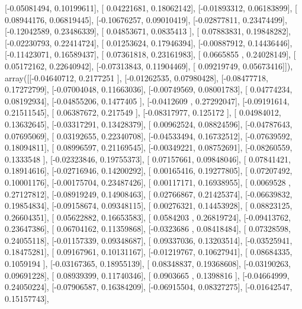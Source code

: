 \documentclass{article}
\begin{document}
       [-0.05081494,  0.10199611],
       [ 0.04221681,  0.18062142],
       [-0.01893312,  0.06183899],
       [ 0.08944176,  0.06819445],
       [-0.10676257,  0.09010419],
       [-0.02877811,  0.23474499],
       [-0.12042589,  0.23486339],
       [ 0.04853671,  0.0835413 ],
       [ 0.07883831,  0.19848282],
       [-0.02230793,  0.22414724],
       [ 0.01253624,  0.17946394],
       [-0.00887912,  0.14436446],
       [-0.11423071,  0.16589437],
       [ 0.07361818,  0.23161983],
       [ 0.0665855 ,  0.24028149],
       [ 0.05172162,  0.22640942],
       [-0.07313843,  0.11904469],
       [ 0.09219749,  0.05673416]]), array([[-0.04640712,  0.2177251 ],
       [-0.01262535,  0.07980428],
       [-0.08477718,  0.17272799],
       [-0.07004048,  0.11663036],
       [-0.00749569,  0.08001783],
       [ 0.04774234,  0.08192934],
       [-0.04855206,  0.1477405 ],
       [-0.0412609 ,  0.27292047],
       [-0.09191614,  0.21511545],
       [ 0.06387672,  0.217549  ],
       [-0.08317977,  0.125172  ],
       [ 0.04984012,  0.13632645],
       [-0.03317291,  0.13428379],
       [ 0.00962524,  0.08824596],
       [-0.04787643,  0.07695069],
       [ 0.03192655,  0.22340708],
       [-0.04533494,  0.16732512],
       [-0.07639592,  0.18094811],
       [ 0.08996597,  0.21169545],
       [-0.00349221,  0.08752691],
       [-0.08260559,  0.1333548 ],
       [-0.02323846,  0.19755373],
       [ 0.07157661,  0.09848046],
       [ 0.07841421,  0.18914616],
       [-0.02716946,  0.14200292],
       [ 0.00165416,  0.19277805],
       [ 0.07207492,  0.10001176],
       [-0.00175704,  0.23487426],
       [ 0.00117171,  0.16938955],
       [ 0.0069528 ,  0.27127812],
       [-0.08919249,  0.14908463],
       [ 0.02766867,  0.21425374],
       [-0.06639832,  0.19854834],
       [-0.09158674,  0.09348115],
       [ 0.00276321,  0.14453928],
       [ 0.08823125,  0.26604351],
       [ 0.05622882,  0.16653583],
       [ 0.0584203 ,  0.26819724],
       [-0.09413762,  0.23647386],
       [ 0.06704162,  0.11359868],
       [-0.0323686 ,  0.08418484],
       [ 0.07328598,  0.24055118],
       [-0.01157339,  0.09348687],
       [ 0.09337036,  0.13203514],
       [-0.03525941,  0.18475281],
       [ 0.09167961,  0.10131167],
       [-0.01219767,  0.10627941],
       [ 0.08684335,  0.1059194 ],
       [-0.03167365,  0.18955139],
       [ 0.08348837,  0.19368608],
       [-0.03190263,  0.09691228],
       [ 0.08939399,  0.11740346],
       [ 0.0903665 ,  0.1398816 ],
       [-0.04664999,  0.24050224],
       [-0.07906587,  0.16384209],
       [-0.06915504,  0.08327275],
       [-0.01642547,  0.15157743],
\end{document}
